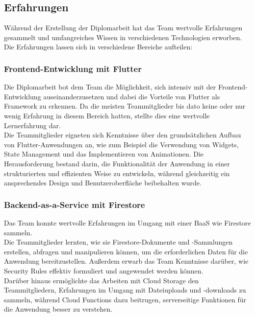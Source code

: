 \subsection{Erfahrungen}

Während der Erstellung der Diplomarbeit hat das Team wertvolle Erfahrungen gesammelt und umfangreiches Wissen in verschiedenen Technologien erworben. Die Erfahrungen lassen sich in verschiedene Bereiche aufteilen:

\subsubsection{Frontend-Entwicklung mit Flutter}

Die Diplomarbeit bot dem Team die Möglichkeit, sich intensiv mit der Frontend-Entwicklung auseinanderzusetzen und dabei die Vorteile von Flutter als Framework zu erkennen. Da die meisten Teammitglieder bis dato keine oder nur wenig Erfahrung in diesem Bereich hatten, stellte dies eine wertvolle Lernerfahrung dar.
\\
Die Teammitglieder eigneten sich Kenntnisse über den grundsätzlichen Aufbau von Flutter-Anwendungen an, wie zum Beispiel die Verwendung von Widgets, State Management und das Implementieren von Animationen. Die Herausforderung bestand darin, die Funktionalität der Anwendung in einer strukturierten und effizienten Weise zu entwickeln, während gleichzeitig ein ansprechendes Design und Benutzeroberfläche beibehalten wurde.

\subsubsection{Backend-as-a-Service mit Firestore}

Das Team konnte wertvolle Erfahrungen im Umgang mit einer BaaS wie Firestore sammeln.
\\
Die Teammitglieder lernten, wie sie Firestore-Dokumente und -Sammlungen erstellen, abfragen und manipulieren können, um die erforderlichen Daten für die Anwendung bereitzustellen. Außerdem erwarb das Team Kenntnisse darüber, wie Security Rules effektiv formuliert und angewendet werden können.
\\
Darüber hinaus ermöglichte das Arbeiten mit Cloud Storage den Teammitgliedern, Erfahrungen im Umgang mit Dateiuploads und -downloads zu sammeln, während Cloud Functions dazu beitrugen, serverseitige Funktionen für die Anwendung besser zu verstehen.


